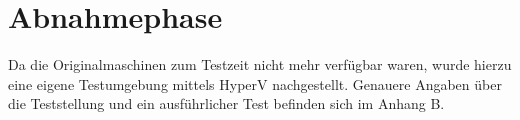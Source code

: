 \section{Abnahmephase} 
\label{sec:Abnahmephase}
Da die Originalmaschinen zum Testzeit nicht mehr verfügbar waren, wurde hierzu eine eigene Testumgebung mittels HyperV nachgestellt. Genauere Angaben über die Teststellung und ein ausführlicher Test befinden sich im Anhang B.


